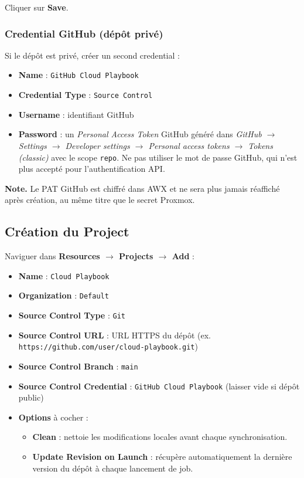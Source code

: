 \documentclass[a4paper]{article}
\newcommand{\cmd}[1]{\texttt{#1}}
\begin{document}
Cliquer sur \textbf{Save}.

\subsubsection*{Credential GitHub (dépôt privé)}

Si le dépôt est privé, créer un second credential :

\begin{itemize}
  \item \textbf{Name} : \cmd{GitHub Cloud Playbook}
  \item \textbf{Credential Type} : \cmd{Source Control}
  \item \textbf{Username} : identifiant GitHub
  \item \textbf{Password} : un \textit{Personal Access Token} GitHub généré dans \textit{GitHub \(\to\) Settings \(\to\) Developer settings \(\to\) Personal access tokens \(\to\) Tokens (classic)} avec le scope \cmd{repo}. Ne pas utiliser le mot de passe GitHub, qui n'est plus accepté pour l'authentification API.
\end{itemize}

\begin{infobox}
  \textbf{Note.} Le PAT GitHub est chiffré dans AWX et ne sera plus jamais réaffiché après création, au même titre que le secret Proxmox.
\end{infobox}

\subsection{Création du Project}

Naviguer dans \textbf{Resources \(\to\) Projects \(\to\) Add} :

\begin{itemize}
  \item \textbf{Name} : \cmd{Cloud Playbook}
  \item \textbf{Organization} : \cmd{Default}
  \item \textbf{Source Control Type} : \cmd{Git}
  \item \textbf{Source Control URL} : URL HTTPS du dépôt (ex. \cmd{https://github.com/user/cloud-playbook.git})
  \item \textbf{Source Control Branch} : \cmd{main}
  \item \textbf{Source Control Credential} : \cmd{GitHub Cloud Playbook} (laisser vide si dépôt public)
  \item \textbf{Options} à cocher :
  \begin{itemize}
    \item \textbf{Clean} : nettoie les modifications locales avant chaque synchronisation.
    \item \textbf{Update Revision on Launch} : récupère automatiquement la dernière version du dépôt à chaque lancement de job.
  \end{itemize}
\end{itemize}
\end{document}
